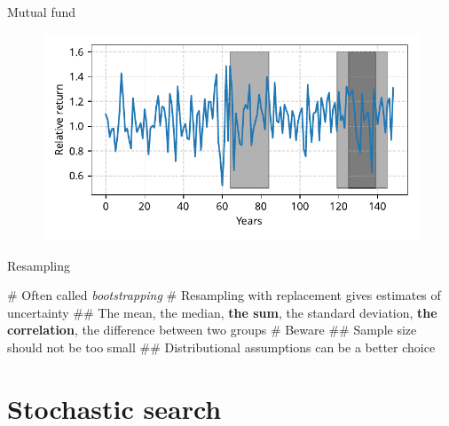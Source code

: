 \documentclass[12pt, aspectratio=149]{beamer}
\theoremstyle{plain}
\begin{document}
\begin{frame}[fragile]{Mutual fund}
 \begin{figure}
    	\centering
    	\includegraphics[width=0.99\linewidth]{figures/stock_returns_2}
 \end{figure}
\end{frame}



\begin{frame}[fragile]{Resampling}
	
	\begin{easylist}[itemize]
		# Often called \emph{bootstrapping}
		# Resampling with replacement gives estimates of uncertainty
		## The mean, the median, \textbf{the sum}, the standard deviation, \textbf{the correlation}, the difference between two groups
		# Beware
		## Sample size should not be too small
		## Distributional assumptions can be a better choice
	\end{easylist}
\end{frame}


\section{Stochastic search}
\end{document}
